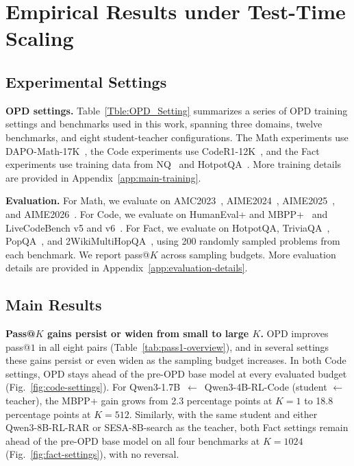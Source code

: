 \documentclass{article}
\theoremstyle{opdplain}
\begin{document}
\section{Empirical Results under Test-Time Scaling}
\label{sec:empirical-results}

\subsection{Experimental Settings}
\label{sec:experimental-settings}

\noindent\textbf{OPD settings.} Table~\ref{Tble:OPD_Setting} summarizes a series of OPD training settings and benchmarks used in this work, spanning three domains, twelve benchmarks, and eight student-teacher configurations. The Math experiments use DAPO-Math-17K~\citep{yu2025dapo}, the Code experiments use CodeR1-12K~\citep{ganler2025coder1}, and the Fact experiments use training data from NQ~\citep{kwiatkowski2019naturalquestions} and HotpotQA~\citep{yang2018hotpotqa}. More training details are provided in Appendix~\ref{app:main-training}.

\noindent\textbf{Evaluation.} For Math, we evaluate on AMC2023~\citep{mathai2023amc23}, AIME2024~\citep{aime24}, AIME2025~\citep{aime25}, and AIME2026~\citep{aime26}.
For Code, we evaluate on HumanEval+ and MBPP+~\citep{liu2023humaneval} and LiveCodeBench v5 and v6~\citep{jain2025livecodebench}.
For Fact, we evaluate on HotpotQA, TriviaQA~\citep{joshi2017triviaqa}, PopQA~\citep{mallen2023PopQA}, and 2WikiMultiHopQA~\citep{ho20202wikiQA}, using 200 randomly sampled problems from each benchmark.
We report pass@$K$ across sampling budgets. More evaluation details are provided in Appendix~\ref{app:evaluation-details}.

\subsection{Main Results}
\noindent\textbf{Pass@$K$ gains persist or widen from small to large $K$.}
OPD improves pass@$1$ in all eight pairs (Table~\ref{tab:pass1-overview}), and in several settings these gains persist or even widen as the sampling budget increases. In both Code settings, OPD stays ahead of the pre-OPD base model at every evaluated budget (Fig.~\ref{fig:code-settings}). For Qwen3-1.7B~$\leftarrow$~Qwen3-4B-RL-Code (student $\leftarrow$ teacher), the MBPP+ gain grows from 2.3 percentage points at $K=1$ to 18.8 percentage points at $K=512$. Similarly, with the same student and either Qwen3-8B-RL-RAR or SESA-8B-search as the teacher, both Fact settings remain ahead of the pre-OPD base model on all four benchmarks at $K=1024$ (Fig.~\ref{fig:fact-settings}), with no reversal.
\end{document}
